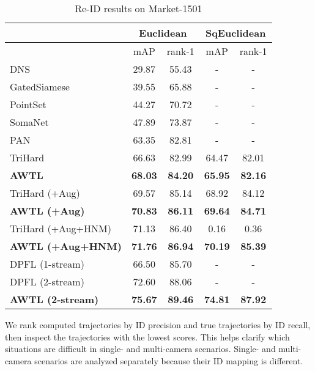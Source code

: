 \documentclass[10pt,twocolumn,letterpaper]{article}
\begin{document}
\begin{table}[t]
	\footnotesize
	\begin{center}
		\begin{tabular}{ |l | c  c | c c|}
			\hline
			& \multicolumn{2}{c|}{Euclidean}  & \multicolumn{2}{c|}{SqEuclidean}    \\ \hline

			& mAP & rank-1  & mAP & rank-1    \\ \hline
			DNS~\cite{zhang2016learning}  & 29.87 & 55.43 & - & -  \\ 
			GatedSiamese~\cite{varior2016gated}  & 39.55 & 65.88 & - &- \\   
			PointSet~\cite{zhou2017point} & 44.27 & 70.72 & - & -  \\ 
			SomaNet~\cite{barbosa2017looking}  & 47.89 & 73.87 & 	- & - \\ 
			PAN~\cite{zheng2017pedestrian} & 63.35 & 82.81 & - & - \\ 
             \hline

   TriHard~\cite{hermans2017defense}  & 66.63 & 82.99 & 64.47 & 82.01  \\ 
   \textbf{AWTL}  & \textbf{68.03} & \textbf{84.20} & \textbf{65.95} & \textbf{82.16} \\ \hline
   TriHard  (+Aug) & 69.57 & 85.14 & 68.92 & 84.12 \\ 
   \textbf{AWTL (+Aug)} & \textbf{70.83} & \textbf{86.11} & \textbf{69.64} & \textbf{84.71} \\ \hline
   TriHard (+Aug+HNM) & 71.13 & 86.40 & 0.16 & 0.36\\ 
   \textbf{AWTL (+Aug+HNM)} & \textbf{71.76} & \textbf{86.94} & \textbf{70.19} & \textbf{85.39} \\ \hline
   DPFL (1-stream)~\cite{chen2017person} & 66.50 & 85.70 & - & - \\ 
   DPFL (2-stream)~\cite{chen2017person} & 72.60 & 88.06 & - & - \\ 
            \textbf{AWTL (2-stream)} & \textbf{75.67} & \textbf{89.46} & \textbf{74.81} & \textbf{87.92} \\ \hline

  
			
		\end{tabular}
	\end{center}
	\caption{Re-ID results on Market-1501}
	\label{tab:market}
\end{table}


We rank computed trajectories by ID precision and true trajectories by ID recall, then inspect the trajectories with the lowest scores. This helps clarify which situations are difficult in single- and multi-camera scenarios. Single- and multi-camera scenarios are analyzed separately because their ID mapping is different. 
\end{document}
